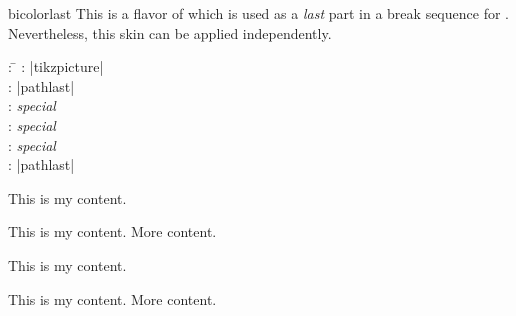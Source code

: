 \clearpage
\begin{docSkin}{bicolorlast}
This is a flavor of  which is used as a \emph{last} part
in a break sequence for .
Nevertheless, this skin can be applied independently.
\begin{tcolorbox}[skintable=bicolorlast]
  \begin{tabbing}
    : \=\kill
    :  \> |tikzpicture|\\ 
    :           \> |pathlast|\\
    : \> \emph{special}\\ 
    :        \> \emph{special}\\
    :    \> \emph{special}\\
    :           \> |pathlast|
  \end{tabbing}
\end{tcolorbox}
\end{docSkin}


\begin{dispExample}
\begin{tcbraster}[skin=bicolorlast,raster equal height,raster columns=4,
    colback=LightGreen,colframe=DarkGreen,colbacklower=LimeGreen!75!LightGreen,
    colbacktitle=LimeGreen!75!DarkGreen,
    left=1mm,right=1mm,top=1mm,bottom=1mm,middle=1mm]
  \begin{tcolorbox}
    This is my content.
  \end{tcolorbox}
  \begin{tcolorbox}
    This is my content.
    \tcblower
    More content.
  \end{tcolorbox}
  \begin{tcolorbox}[adjusted title=My title]
    This is my content.
  \end{tcolorbox}
  \begin{tcolorbox}[adjusted title=My title]
    This is my content.
    \tcblower
    More content.
  \end{tcolorbox}
\end{tcbraster}
\end{dispExample}



\clearpage
